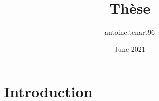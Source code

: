 \documentclass{article}
\title{Thèse}
\author{antoine.tenart96 }
\date{June 2021}
\begin{document}
\maketitle

\section{Introduction}
\end{document}
